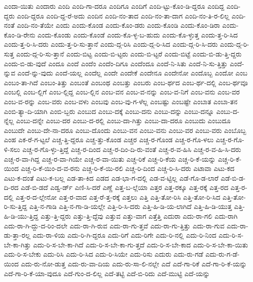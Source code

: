 {ಎಂದಾ-ಯಿತು
ಎಂದಾರು
ಎಂದಿ
ಎಂದಿ-ಗಾ-ದರೂ
ಎಂದಿಗೂ
ಎಂದಿಗೆ
ಎಂದಿ-ಟ್ಟು-ಕೊಂ-ಡಿ-ದ್ದರೂ
ಎಂದಿದ್ದ
ಎಂದಿ-ದ್ದರು
ಎಂದಿ-ದ್ದರೂ
ಎಂದಿ-ದ್ದ-ರೆ-ಅದು
ಎಂದಿನ
ಎಂದಿ-ನಂ-ತಾದ
ಎಂದಿ-ನಂ-ತಾ-ದಾಗ
ಎಂದಿ-ನಂ-ತಿ-ರ-ಲಿಲ್ಲ
ಎಂದಿ-ನಂತೆ
ಎಂದಿ-ನಂ-ತೆಯೇ
ಎಂದು
ಎಂದು-ಕೊಂಡ
ಎಂದು-ಕೊಂ-ಡರು
ಎಂದು-ಕೊಂಡಿ
ಎಂದು-ಕೊಂ-ಡಿರಾ
ಎಂದು-ಕೊಂ-ಡಿ-ರೇನು
ಎಂದು-ಕೊಂಡು
ಎಂದು-ಕೊಂಡೆ
ಎಂದು-ಕೊ-ಳ್ಳ-ಬ-ಹುದು
ಎಂದು-ಕೊ-ಳ್ಳುತ್ತ
ಎಂದು-ತ್ತ-ರಿ-ಸಿದ
ಎಂದು-ತ್ತ-ರಿ-ಸಿ-ದರು
ಎಂದು-ತ್ತ-ರಿ-ಸು-ತ್ತಾನೆ
ಎಂದು-ದ್ಗ-ರಿಸಿ
ಎಂದು-ದ್ಗ-ರಿ-ಸಿದ
ಎಂದು-ದ್ಗ-ರಿ-ಸಿ-ದರು
ಎಂದು-ದ್ಗ-ರಿ-ಸುತ್ತ
ಎಂದು-ದ್ಗ-ರಿ-ಸು-ತ್ತಾನೆ
ಎಂದು-ಬಿಟ್ಟ
ಎಂದು-ಬಿ-ಟ್ಟರು
ಎಂದು-ಬಿ-ಟ್ಟರೆ
ಎಂದು-ಬಿಟ್ಟೆ
ಎಂದು-ಬಿ-ಡು-ತ್ತಿ-ದ್ದರು
ಎಂದು-ಬಿ-ಡು-ವುದೆ
ಎಂದೂ
ಎಂದೆ
ಎಂದೆಂ
ಎಂದೆಂ-ದಿಗೂ
ಎಂದೆಂದೂ
ಎಂದೆ-ನಿ-ಸಿತು
ಎಂದೆ-ನಿ-ಸು-ತ್ತಿತ್ತು
ಎಂದೆ-ನ್ನುವ
ಎಂದೆ-ನ್ನು-ವುದು
ಎಂದೆ-ಯಲ್ಲ
ಎಂದೆಲ್ಲ
ಎಂದೇ
ಎಂದೇಕೆ
ಎಂದೇನೂ
ಎಂದೇನೋ
ಎಂದೊಬ್ಬ
ಎಂದೋ
ಎಂಬ
ಎಂಬಂ-ತಾ-ಗಿದೆ
ಎಂಬಂ-ತಿತ್ತು
ಎಂಬಂತೆ
ಎಂಬಂಥ
ಎಂಬತ್ತು
ಎಂಬರು
ಎಂಬ-ರ್ಥದ
ಎಂಬ-ರ್ಥ-ದಲ್ಲಿ
ಎಂಬ-ರ್ಥವೂ
ಎಂಬಲ್ಲಿ
ಎಂಬ-ಲ್ಲಿಗೆ
ಎಂಬ-ಲ್ಲಿದ್ದ
ಎಂಬ-ಲ್ಲಿನ
ಎಂಬ-ವನ
ಎಂಬ-ವ-ನನ್ನು
ಎಂಬ-ವ-ನಿಗೆ
ಎಂಬ-ವನು
ಎಂಬ-ವರ
ಎಂಬ-ವ-ರನ್ನು
ಎಂಬ-ವರು
ಎಂಬ-ವಳು
ಎಂಬವು
ಎಂಬ-ವು-ಗ-ಳೆಲ್ಲ
ಎಂಬಷ್ಟು
ಎಂಬಷ್ಟೇ
ಎಂಬಾತ
ಎಂಬಾ-ತನ
ಎಂಬಿ-ತ್ಯಾ-ದಿ-ಯಾಗಿ
ಎಂಬಿ-ಬ್ಬರು
ಎಂಬುದ
ಎಂಬು-ದಕ್ಕೆ
ಎಂಬು-ದನು
ಎಂಬು-ದನ್ನು
ಎಂಬು-ದನ್ನೂ
ಎಂಬು-ದ-ನ್ನೆಲ್ಲ
ಎಂಬು-ದನ್ನೇ
ಎಂಬು-ದರ
ಎಂಬು-ದ-ರಲ್ಲಿ
ಎಂಬು-ದಾ-ಗಿತ್ತು
ಎಂಬು-ದಾ-ದರೂ
ಎಂಬುದು
ಎಂಬುದೂ
ಎಂಬುದೇ
ಎಂಬು-ದೇ-ನಾ-ದರೂ
ಎಂಬು-ದೊಂದು
ಎಂಬು-ವನ
ಎಂಬು-ವನು
ಎಂಬು-ವರ
ಎಂಬು-ವರು
ಎಂಬೊಬ್ಬ
ಎಂಹ
ಎಕ-ರೆ-ಗ-ಟ್ಟಲೆ
ಎಚ್ಚ-ತ್ತಿ-ದ್ದರೂ
ಎಚ್ಚ-ತ್ತು-ಕೊಂಡ
ಎಚ್ಚರ
ಎಚ್ಚ-ರ-ಗೊಂಡ
ಎಚ್ಚ-ರ-ಗೊ-ಳಲು
ಎಚ್ಚ-ರ-ಗೊ-ಳಿ-ಸಲು
ಎಚ್ಚ-ರ-ಗೊ-ಳ್ಳು-ತ್ತಿದ್ದೆ
ಎಚ್ಚ-ರ-ದಿಂದ
ಎಚ್ಚ-ರ-ದಿಂ-ದಿ-ರು-ವಂತೆ
ಎಚ್ಚ-ರ-ವ-ಹಿಸಿ
ಎಚ್ಚ-ರ-ವ-ಹಿ-ಸಿ-ದರು
ಎಚ್ಚ-ರ-ವಾ-ಗಿದ್ದ
ಎಚ್ಚ-ರ-ವಾ-ಗಿಯೇ
ಎಚ್ಚ-ರ-ವಾ-ಯಿತು
ಎಚ್ಚ-ರಿಕೆ
ಎಚ್ಚ-ರಿ-ಕೆಯ
ಎಚ್ಚ-ರಿ-ಕೆ-ಯನ್ನು
ಎಚ್ಚ-ರಿ-ಕೆ-ಯಿಂದ
ಎಚ್ಚ-ರಿ-ಕೆ-ಯಿಂ-ದ-ವ-ರನು
ಎಚ್ಚ-ರಿ-ಕೆ-ಯಿ-ರಲಿ
ಎಚ್ಚ-ರಿ-ದಿಂದ
ಎಚ್ಚ-ರಿ-ಸಿ-ದರು
ಎಟಾವಾ
ಎಟು-ಕದ
ಎಟು-ಕ-ದಂತೆ
ಎಟು-ಕ-ಬಲ್ಲ
ಎಡ-ತಾ-ಕಿದ
ಎಡದ
ಎಡ-ಭಾ-ಗ-ದಲ್ಲಿ
ಎಡ-ವ-ಟ್ಟಿಲ್ಲ
ಎಡೆ-ಗೊ-ಡ-ಲಾರೆ
ಎಡೆ-ಬಿ-ಡ-ದಿ-ರದ
ಎಡೆ-ಬಿ-ಡದೆ
ಎಡ್ವ-ರ್ಡ್
ಎಣಿ-ಸಿ-ದರೆ
ಎಣ್ಣೆ
ಎತ್ತ-ಬ-ಲ್ಲೆಯಾ
ಎತ್ತರ
ಎತ್ತ-ರಕ್ಕೂ
ಎತ್ತ-ರಕ್ಕೆ
ಎತ್ತ-ರದ
ಎತ್ತ-ರ-ದಲ್ಲಿ
ಎತ್ತ-ರ-ದ-ಲ್ಲೇನೋ
ಎತ್ತ-ರ-ವಾದ
ಎತ್ತ-ರೆ-ತ್ತ-ರಕ್ಕೆ
ಎತ್ತಲು
ಎತ್ತಿ
ಎತ್ತಿ-ತೋ-ರಿಸಿ
ಎತ್ತಿ-ತೋ-ರಿ-ಸಿದ
ಎತ್ತಿ-ತೋ-ರಿ-ಸು-ತ್ತಿದ್ದ
ಎತ್ತಿ-ನ-ಗಾಡಿ
ಎತ್ತಿ-ನ-ಗಾ-ಡಿ-ಯಲ್ಲೇ
ಎತ್ತಿ-ರಿ-ಸಿ-ದರು
ಎತ್ತಿ-ಹಿ-ಡಿ-ಯ-ಲಾಗಿದೆ
ಎತ್ತಿ-ಹಿ-ಡಿ-ಯುತ್ತ
ಎತ್ತಿ-ಹಿ-ಡಿ-ಯು-ತ್ತಿದ್ದ
ಎತ್ತು-ತ್ತಿ-ದ್ದರು
ಎತ್ತು-ತ್ತಿ-ದ್ದೆವು
ಎತ್ತುವ
ಎತ್ತು-ವಾಗ
ಎತ್ತೆತ್ತಿ
ಎದುರಾ
ಎದು-ರಾ-ಗಲಿ
ಎದು-ರಾಗಿ
ಎದು-ರಾ-ಗಿ-ದ್ದು-ದ-ರಿಂ-ದಲೇ
ಎದು-ರಾ-ಗಿ-ರುವ
ಎದು-ರಾ-ಗು-ತ್ತವೆ
ಎದು-ರಾ-ಗು-ತ್ತಿತ್ತು
ಎದು-ರಾ-ಗುವ
ಎದು-ರಾ-ಡು-ತ್ತಾ-ರಲ್ಲ
ಎದು-ರಾ-ಳಿಯ
ಎದು-ರಿ-ಗಿ-ದ್ದರೂ
ಎದು-ರಿಗೆ
ಎದು-ರಿಗೇ
ಎದು-ರಿ-ನಲ್ಲಿ
ಎದು-ರಿ-ನಿಂದ
ಎದು-ರಿ-ಸ-ಬೇ-ಕಾ-ಗಿತ್ತು
ಎದು-ರಿ-ಸ-ಬೇ-ಕಾ-ಗಿದೆ
ಎದು-ರಿ-ಸ-ಬೇ-ಕಾ-ಗು-ತ್ತದೆ
ಎದು-ರಿ-ಸ-ಬೇ-ಕಾದ
ಎದು-ರಿ-ಸ-ಬೇ-ಕಾ-ಯಿತು
ಎದು-ರಿ-ಸ-ಬೇಕು
ಎದು-ರಿಸಿ
ಎದು-ರಿ-ಸಿದ
ಎದು-ರಿ-ಸಿಯೇ
ಎದು-ರಿಸು
ಎದುರು
ಎದು-ರು-ಗಡೆ
ಎದು-ರು-ಗ-ಡೆ-ಯಿಂದ
ಎದು-ರು-ನೋ-ಡುತ್ತ
ಎದು-ರು-ವಾ-ದಿಯ
ಎದು-ರು-ಸಾ-ಲಿ-ನಲ್ಲೇ
ಎದೆ
ಎದೆ-ಗಾ-ರಿಕೆ
ಎದೆ-ಗಾ-ರಿ-ಕೆ-ಯನ್ನು
ಎದೆ-ಗಾ-ರಿ-ಕೆ-ಯಾ-ವುದೂ
ಎದೆ-ಗುಂ-ದ-ಲಿಲ್ಲ
ಎದೆ-ತಟ್ಟಿ
ಎದೆ-ಬಿ-ರಿದು
ಎದೆ-ಮುಟ್ಟಿ
ಎದೆ-ಯನ್ನು
}
